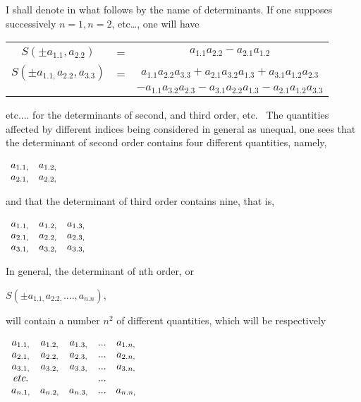\documentclass[11pt]{article}%
\theoremstyle{definition}
\begin{document}
\textsf{I shall denote in what follows by the name of determinants. If one
supposes successively }$n=1,n=2$\textsf{, etc\ldots, one will have}

\begin{center}%
\begin{tabular}
[c]{ccc}%
$S(\pm a_{1.1},a_{2.2})$ & \textsf{=} & $a_{1.1}a_{2.2}-a_{2.1}a_{1.2}$\\
$S(\pm a_{1.1,}a_{2.2},a_{3.3})$ & \textsf{=} & $a_{1.1}a_{2.2}a_{3.3}%
+a_{2.1}a_{3.2}a_{1.3}+a_{3.1}a_{1.2}a_{2.3}$\\
&  & $-a_{1.1}a_{3.2}a_{2.3}-a_{3.1}a_{2.2}a_{1.3}-a_{2.1}a_{1.2}a_{3.3}$%
\end{tabular}



\end{center}

\noindent\textsf{etc.... for the determinants of second, and third order, etc.
\ The quantities affected by different indices being considered in general as
unequal, one sees that the determinant of second order contains four different
quantities, namely,}

\begin{center}
$%
\begin{array}
[c]{cc}%
a_{1.1,} & a_{1.2,}\\
a_{2.1,} & a_{2.2,}%
\end{array}
$
\end{center}

\noindent\textsf{and that the determinant of third order contains nine, that
is,}

\begin{center}
$%
\begin{array}
[c]{ccc}%
a_{1.1,} & a_{1.2,} & a_{1.3,}\\
a_{2.1,} & a_{2.2,} & a_{2.3,}\\
a_{3.1,} & a_{3.2,} & a_{3.3,}%
\end{array}
$
\end{center}

\textsf{In general, the determinant of nth order, or}

\begin{center}
$S(\pm a_{1.1,}a_{2.2,}....,a_{n.n})$\textsf{,}
\end{center}

\noindent\textsf{will contain a number }$n^{2}$ \textsf{of different
quantities, which will be respectively}

\begin{center}
$%
\begin{array}
[c]{ccccc}%
a_{1.1,} & a_{1.2,} & a_{1.3,} & ... & a_{1.n,}\\
a_{2.1,} & a_{2.2,} & a_{2.3,} & ... & a_{2.n,}\\
a_{3.1,} & a_{3.2,} & a_{3.3,} & ... & a_{3.n,}\\
etc. &  &  & ... & \\
a_{n.1,} & a_{n.2,} & a_{n.3,} & ... & a_{n.n,}%
\end{array}
$
\end{center}
\end{document}
